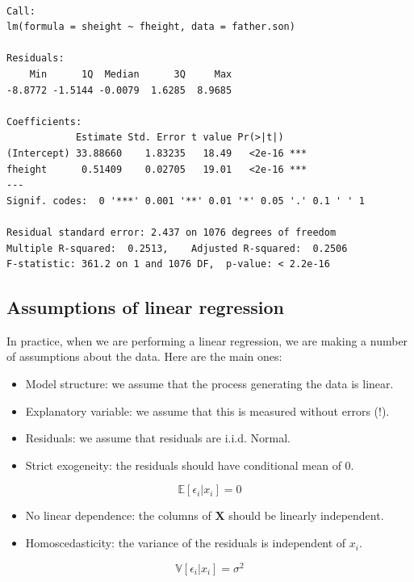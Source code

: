 \documentclass[
  letterpaper,
  DIV=11,
  numbers=noendperiod]{scrreprt}
\providecommand{\tightlist}{%
  \setlength{\itemsep}{0pt}\setlength{\parskip}{0pt}}\usepackage{longtable,booktabs,array}
\begin{document}
\begin{verbatim}

Call:
lm(formula = sheight ~ fheight, data = father.son)

Residuals:
    Min      1Q  Median      3Q     Max 
-8.8772 -1.5144 -0.0079  1.6285  8.9685 

Coefficients:
            Estimate Std. Error t value Pr(>|t|)    
(Intercept) 33.88660    1.83235   18.49   <2e-16 ***
fheight      0.51409    0.02705   19.01   <2e-16 ***
---
Signif. codes:  0 '***' 0.001 '**' 0.01 '*' 0.05 '.' 0.1 ' ' 1

Residual standard error: 2.437 on 1076 degrees of freedom
Multiple R-squared:  0.2513,    Adjusted R-squared:  0.2506 
F-statistic: 361.2 on 1 and 1076 DF,  p-value: < 2.2e-16
\end{verbatim}

\hypertarget{assumptions-of-linear-regression}{%
\subsection{Assumptions of linear
regression}\label{assumptions-of-linear-regression}}

In practice, when we are performing a linear regression, we are making a
number of assumptions about the data. Here are the main ones:

\begin{itemize}
\tightlist
\item
  Model structure: we assume that the process generating the data is
  linear.
\item
  Explanatory variable: we assume that this is measured without errors
  (!).
\item
  Residuals: we assume that residuals are i.i.d. Normal.
\item
  Strict exogeneity: the residuals should have conditional mean of 0.
\end{itemize}

\[
\mathbb E[\epsilon_i | x_i] = 0
\]

\begin{itemize}
\tightlist
\item
  No linear dependence: the columns of \(\mathbf{X}\) should be linearly
  independent.
\item
  Homoscedasticity: the variance of the residuals is independent of
  \(x_i\).
\end{itemize}

\[
\mathbb V[\epsilon_i | x_i] =  \sigma^2
\]
\end{document}
